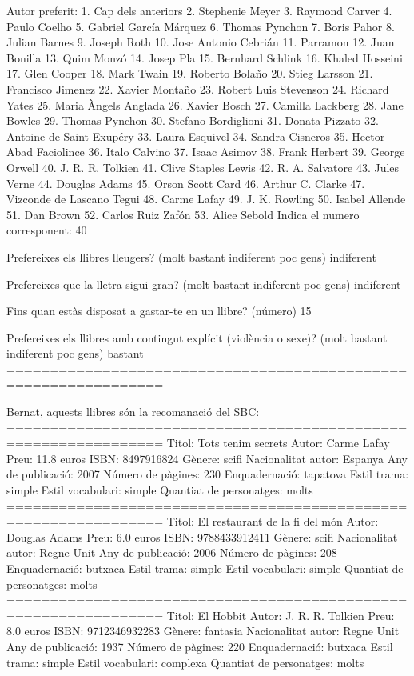 Autor preferit: 
  1. Cap dels anteriors
  2. Stephenie Meyer
  3. Raymond Carver
  4. Paulo Coelho
  5. Gabriel García Márquez
  6. Thomas Pynchon
  7. Boris Pahor
  8. Julian Barnes
  9. Joseph Roth
  10. Jose Antonio Cebrián
  11. Parramon
  12. Juan Bonilla
  13. Quim Monzó
  14. Josep Pla
  15. Bernhard Schlink
  16. Khaled Hosseini
  17. Glen Cooper
  18. Mark Twain
  19. Roberto Bolaño
  20. Stieg Larsson
  21. Francisco Jimenez
  22. Xavier Montaño
  23. Robert Luis Stevenson
  24. Richard Yates
  25. Maria Àngels Anglada
  26. Xavier Bosch
  27. Camilla Lackberg
  28. Jane Bowles
  29. Thomas Pynchon
  30. Stefano Bordiglioni
  31. Donata Pizzato
  32. Antoine de Saint-Exupéry
  33. Laura Esquivel
  34. Sandra Cisneros
  35. Hector Abad Faciolince
  36. Italo Calvino
  37. Isaac Asimov
  38. Frank Herbert
  39. George Orwell
  40. J. R. R. Tolkien
  41. Clive Staples Lewis
  42. R. A. Salvatore
  43. Jules Verne
  44. Douglas Adams
  45. Orson Scott Card
  46. Arthur C. Clarke
  47. Vizconde de Lascano Tegui
  48. Carme Lafay
  49. J. K. Rowling
  50. Isabel Allende
  51. Dan Brown
  52. Carlos Ruiz Zafón
  53. Alice Sebold
Indica el numero corresponent: 40

Prefereixes els llibres lleugers? (molt bastant indiferent poc gens) indiferent

Prefereixes que la lletra sigui gran? (molt bastant indiferent poc gens) indiferent

Fins quan estàs disposat a gastar-te en un llibre? (número) 15

Prefereixes els llibres amb contingut explícit (violència o sexe)? (molt bastant indiferent poc gens) bastant
================================================================

Bernat, 
aquests llibres són la recomanació del SBC: 
================================================================
Titol:                   Tots tenim secrets
Autor:                   Carme Lafay
Preu:                    11.8 euros
ISBN:                    8497916824
Gènere:                  scifi
Nacionalitat autor:      Espanya
Any de publicació:       2007
Número de pàgines:       230
Enquadernació:           tapatova
Estil trama:             simple
Estil vocabulari:        simple
Quantiat de personatges: molts
================================================================
Titol:                   El restaurant de la fi del món
Autor:                   Douglas Adams
Preu:                    6.0 euros
ISBN:                    9788433912411
Gènere:                  scifi
Nacionalitat autor:      Regne Unit
Any de publicació:       2006
Número de pàgines:       208
Enquadernació:           butxaca
Estil trama:             simple
Estil vocabulari:        simple
Quantiat de personatges: molts
================================================================
Titol:                   El Hobbit
Autor:                   J. R. R. Tolkien
Preu:                    8.0 euros
ISBN:                    9712346932283
Gènere:                  fantasia
Nacionalitat autor:      Regne Unit
Any de publicació:       1937
Número de pàgines:       220
Enquadernació:           butxaca
Estil trama:             simple
Estil vocabulari:        complexa
Quantiat de personatges: molts

